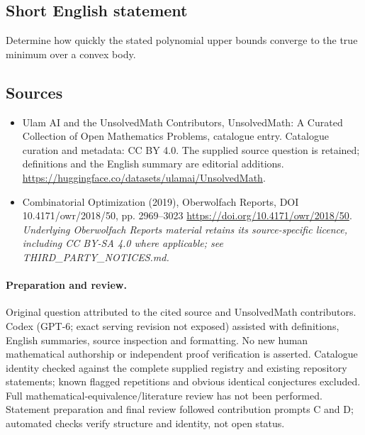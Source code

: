 \documentclass[11pt]{article}
\begin{document}
\subsection{Short English statement}
Determine how quickly the stated polynomial upper bounds converge to the true minimum over a convex body.
\subsection{Sources}
\begin{itemize}
\item[\hypertarget{source:statement:1}{S1}] Ulam AI and the UnsolvedMath Contributors, UnsolvedMath: A Curated Collection of Open Mathematics Problems, catalogue entry. Catalogue curation and metadata: CC BY 4.0. The supplied source question is retained; definitions and the English summary are editorial additions.
\url{https://huggingface.co/datasets/ulamai/UnsolvedMath}.
\item[\hypertarget{source:statement:2}{S2}] Combinatorial Optimization (2019), Oberwolfach Reports, DOI 10.4171/owr/2018/50, pp. 2969--3023
\url{https://doi.org/10.4171/owr/2018/50}.
\textit{Underlying Oberwolfach Reports material retains its source-specific licence, including CC BY-SA 4.0 where applicable; see THIRD\_PARTY\_NOTICES.md.}
\end{itemize}
\paragraph{Preparation and review.}
Original question attributed to the cited source and UnsolvedMath contributors. Codex (GPT-6; exact serving revision not exposed) assisted with definitions, English summaries, source inspection and formatting. No new human mathematical authorship or independent proof verification is asserted. Catalogue identity checked against the complete supplied registry and existing repository statements; known flagged repetitions and obvious identical conjectures excluded. Full mathematical-equivalence/literature review has not been performed. Statement preparation and final review followed contribution prompts C and D; automated checks verify structure and identity, not open status.
\label{end:statement}
\end{document}
